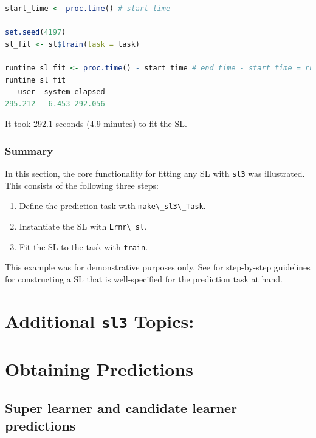 \documentclass[
  12pt, krantz2,
]{krantz}
\newcommand{\passthrough}[1]{#1}
\providecommand{\tightlist}{%
  \setlength{\itemsep}{0pt}\setlength{\parskip}{0pt}}
\newcommand{\1}{\mathbbm{1}}
\theoremstyle{definition}
\theoremstyle{definition}
\theoremstyle{definition}
\theoremstyle{definition}
\theoremstyle{remark}
\begin{document}
\begin{lstlisting}[language=R]
start_time <- proc.time() # start time

set.seed(4197)
sl_fit <- sl$train(task = task)

runtime_sl_fit <- proc.time() - start_time # end time - start time = run time
runtime_sl_fit
   user  system elapsed 
295.212   6.453 292.056 
\end{lstlisting}

It took 292.1 seconds
(4.9 minutes) to fit the SL.

\hypertarget{summary}{%
\subsubsection*{Summary}\label{summary}}


In this section, the core functionality for fitting any SL with \passthrough{\lstinline!sl3!} was
illustrated. This consists of the following three steps:

\begin{enumerate}
\def\labelenumi{\arabic{enumi}.}
\tightlist
\item
  Define the prediction task with \passthrough{\lstinline!make\_sl3\_Task!}.
\item
  Instantiate the SL with \passthrough{\lstinline!Lrnr\_sl!}.
\item
  Fit the SL to the task with \passthrough{\lstinline!train!}.
\end{enumerate}

This example was for demonstrative purposes only. See \citet{rvp2022super} for
step-by-step guidelines for constructing a SL that is well-specified for the
prediction task at hand.

\hypertarget{additional-sl3-topics}{%
\section*{\texorpdfstring{Additional \texttt{sl3} Topics:}{Additional sl3 Topics:}}\label{additional-sl3-topics}}


\hypertarget{obtaining-predictions}{%
\section{Obtaining Predictions}\label{obtaining-predictions}}

\hypertarget{super-learner-and-candidate-learner-predictions}{%
\subsection{Super learner and candidate learner predictions}\label{super-learner-and-candidate-learner-predictions}}
\end{document}
